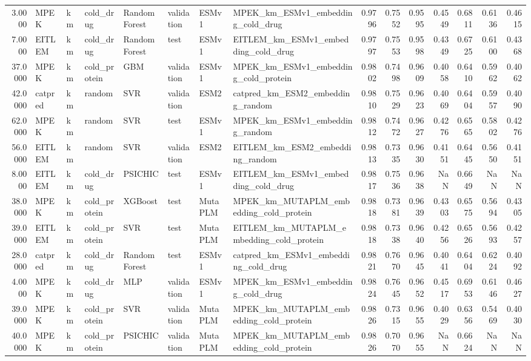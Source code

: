 \begin{tabular}{rlllllllrrrrrrr}
3.0000 & MPEK & km & cold_drug & Random Forest & validation & ESMv1 & MPEK_km_ESMv1_embedding_cold_drug & 0.9796 & 0.7552 & 0.9595 & 0.4549 & 0.6811 & 0.6136 & 0.4615 \\
7.0000 & EITLEM & km & cold_drug & Random Forest & test & ESMv1 & EITLEM_km_ESMv1_embedding_cold_drug & 0.9797 & 0.7553 & 0.9598 & 0.4349 & 0.6725 & 0.6100 & 0.4368 \\
37.0000 & MPEK & km & cold_protein & GBM & validation & ESMv1 & MPEK_km_ESMv1_embedding_cold_protein & 0.9802 & 0.7498 & 0.9609 & 0.4058 & 0.6410 & 0.5962 & 0.4062 \\
42.0000 & catpred & km & random & SVR & validation & ESM2 & catpred_km_ESM2_embedding_random & 0.9810 & 0.7529 & 0.9623 & 0.4069 & 0.6404 & 0.5957 & 0.4090 \\
62.0000 & MPEK & km & random & SVR & test & ESMv1 & MPEK_km_ESMv1_embedding_random & 0.9812 & 0.7472 & 0.9627 & 0.4276 & 0.6565 & 0.5802 & 0.4276 \\
56.0000 & EITLEM & km & random & SVR & validation & ESM2 & EITLEM_km_ESM2_embedding_random & 0.9813 & 0.7335 & 0.9630 & 0.4151 & 0.6445 & 0.5650 & 0.4151 \\
8.0000 & EITLEM & km & cold_drug & PSICHIC & test & ESMv1 & EITLEM_km_ESMv1_embedding_cold_drug & 0.9817 & 0.7536 & 0.9638 & NaN & 0.6649 & NaN & NaN \\
38.0000 & MPEK & km & cold_protein & XGBoost & test & MutaPLM & MPEK_km_MUTAPLM_embedding_cold_protein & 0.9818 & 0.7381 & 0.9639 & 0.4303 & 0.6575 & 0.5694 & 0.4305 \\
39.0000 & EITLEM & km & cold_protein & SVR & test & MutaPLM & EITLEM_km_MUTAPLM_embedding_cold_protein & 0.9818 & 0.7338 & 0.9640 & 0.4256 & 0.6526 & 0.5693 & 0.4257 \\
28.0000 & catpred & km & cold_drug & Random Forest & test & ESMv1 & catpred_km_ESMv1_embedding_cold_drug & 0.9821 & 0.7670 & 0.9645 & 0.4041 & 0.6404 & 0.6224 & 0.4092 \\
4.0000 & MPEK & km & cold_drug & MLP & validation & ESMv1 & MPEK_km_ESMv1_embedding_cold_drug & 0.9824 & 0.7645 & 0.9652 & 0.4517 & 0.6953 & 0.6146 & 0.4627 \\
39.0000 & MPEK & km & cold_protein & SVR & validation & MutaPLM & MPEK_km_MUTAPLM_embedding_cold_protein & 0.9826 & 0.7315 & 0.9655 & 0.4029 & 0.6356 & 0.5469 & 0.4030 \\
40.0000 & MPEK & km & cold_protein & PSICHIC & validation & MutaPLM & MPEK_km_MUTAPLM_embedding_cold_protein & 0.9826 & 0.7070 & 0.9655 & NaN & 0.6624 & NaN & NaN \\

\end{tabular}

